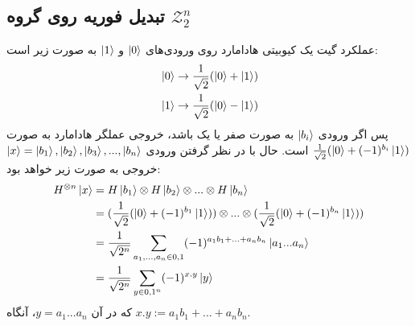   \subsection{تبدیل فوریه روی گروه $\mathcal{Z}_{2}^{n}$}
  عملکرد گیت یک کیوبیتی هادامارد روی ورودی‌های  $\ket{0}$  و  $\ket{1}$ به صورت زیر است:
   \begin{equation}
   	\begin{split}
   		& \ket{0} \rightarrow \frac{1}{\sqrt{2}}(\ket{0} + \ket{1}) \\
   		& \ket{1} \rightarrow \frac{1}{\sqrt{2}}(\ket{0} - \ket{1}) 
   	\end{split}
   \end{equation}
  پس اگر ورودی $\ket{b_{i}}$ به صورت صفر یا یک باشد، خروجی عملگر هادامارد به صورت 
  $\frac{1}{\sqrt{2}}(\ket{0} + (-1)^{b_{i}}\ket{1})$ است. 
  حال با در نظر گرفتن ورودی 
  $\ket{x} = \ket{b_{1}}, \ket{b_{2}}, \ket{b_{3}}, ..., \ket{b_{n}}$ خروجی به صورت زیر خواهد بود: 
  \begin{equation}
  \begin{split}
  	H^{\otimes n}\ket{x} & = H\ket{b_1} \otimes H\ket{b_2} \otimes ... \otimes H\ket{b_n} \\
  	& = (\frac{1}{\sqrt{2}}(\ket{0} + (-1)^{b_{1}}\ket{1})) \otimes ... \otimes (\frac{1}{\sqrt{2}}(\ket{0} + (-1)^{b_{n}}\ket{1})) \\
  	& = \frac{1}{\sqrt{2^{n}}} \sum_{a_{1},...,a_{n} \in {0,1}} (-1)^{a_{1}b_{1}+...+a_{n}b_{n}}\ket{a_{1}...a_{n}} \\
  	& = \frac{1}{\sqrt{2^{n}}} \sum_{y\in {0,1}^{n}} (-1)^{x.y}\ket{y}
  	\end{split}
  \end{equation}
  که در آن $y=a_{1}...a_{n}$، آنگاه 
  $x.y := a_{1}b_{1} + ... + a_{n}b_{n}$.
